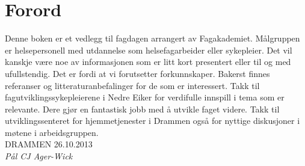 		\chapter{Forord}%
				Denne boken er et vedlegg til fagdagen arrangert av Fagakademiet. Målgruppen er helsepersonell med utdannelse som helsefagarbeider eller sykepleier. Det vil kanskje være noe av informasjonen som er litt kort presentert eller til og med ufullstendig. Det er fordi at vi forutsetter forkunnskaper. Bakerst finnes referanser og litteraturanbefalinger for de som er interessert. Takk til fagutviklingssykepleierene i Nedre Eiker for verdifulle innspill i tema som er relevante. Dere gjør en fantastisk jobb med å utvikle faget videre. Takk til utviklingssenteret for hjemmetjenester i Drammen også for nyttige diskusjoner i møtene i arbeidsgruppen.
				\\[0.7in]



				DRAMMEN 26.10.2013\\[0.4in]

				\emph{Pål CJ Ager-Wick}


	\tableofcontents